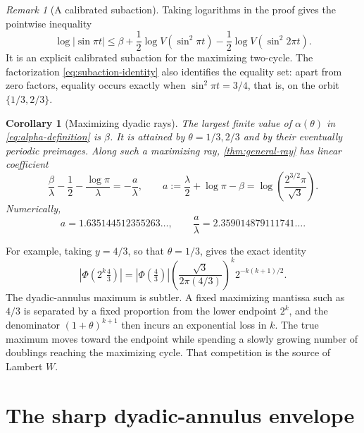 \documentclass[11pt,oneside]{article}
\newtheorem{corollary}[corollary]{Corollary}
\theoremstyle{definition}
\theoremstyle{remark}
\newtheorem{remark}[remark]{Remark}
\newcommand{\PhiF}{\Phi}
\begin{document}
\begin{remark}[A calibrated subaction]
Taking logarithms in the proof gives the pointwise inequality
\begin{equation}
 \log|\sin\pi t|
 \le\beta+\frac12\log V(\sin^2\pi t)
 -\frac12\log V(\sin^2 2\pi t).
 \label{eq:calibrated-subaction}
\end{equation}
It is an explicit calibrated subaction for the maximizing two-cycle.  The
factorization \eqref{eq:subaction-identity} also identifies the equality set:
apart from zero factors, equality occurs exactly when
\(\sin^2\pi t=3/4\), that is, on the orbit \(\{1/3,2/3\}\).
\end{remark}

\begin{corollary}[Maximizing dyadic rays]
\label{cor:maximizing-ray}
The largest finite value of \(\alpha(\theta)\) in
\eqref{eq:alpha-definition} is \(\beta\).  It is attained by
\(\theta=1/3,2/3\) and by their eventually periodic preimages.  Along such a
maximizing ray, \cref{thm:general-ray} has linear coefficient
\begin{equation}
 \frac{\beta}{\lambda}-\frac12-\frac{\log\pi}{\lambda}
 =-\frac{a}{\lambda},
 \qquad
 a:=\frac\lambda2+\log\pi-\beta
 =\log\!\left(\frac{2^{3/2}\pi}{\sqrt3}\right).
 \label{eq:a-constant}
\end{equation}
Numerically,
\[
 a=1.635144512355263\ldots,
 \qquad
 \frac{a}{\lambda}=2.359014879111741\ldots.
\]
\end{corollary}

For example, taking \(y=4/3\), so that \(\theta=1/3\), gives the exact
identity
\begin{equation}
 |\PhiF(2^k\tfrac43)|
 =|\PhiF(\tfrac43)|
 \left(\frac{\sqrt3}{2\pi(4/3)}\right)^k
 2^{-k(k+1)/2}.
 \label{eq:maximizing-ray-exact}
\end{equation}
The dyadic-annulus maximum is subtler.  A fixed maximizing mantissa such as
\(4/3\) is separated by a fixed proportion from the lower endpoint \(2^k\),
and the denominator \((1+\theta)^{k+1}\) then incurs an exponential loss in
\(k\).  The true maximum moves toward the endpoint while spending a slowly
growing number of doublings reaching the maximizing cycle.  That competition
is the source of Lambert \(W\).

\section{The sharp dyadic-annulus envelope}
\label{sec:annulus}
\end{document}
